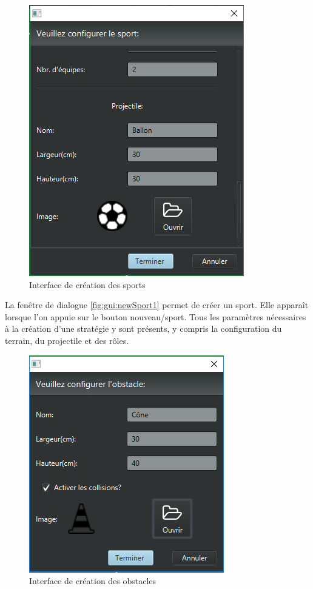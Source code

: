 \begin{figure}[htpb]
    \centering
    \includegraphics[scale=0.6]{fig/gui/newSport3.png}
    \caption{Interface de création des sports}
    \label{fig:gui:newSport3}
\end{figure}

La fenêtre de dialogue \ref{fig:gui:newSport1} permet de créer un sport.
Elle apparaît lorsque l'on appuie sur le bouton nouveau/sport.
Tous les paramètres nécessaires à la création d'une stratégie y sont présents, y compris la configuration du terrain, du projectile et des rôles.

\newpage

\begin{figure}[htpb]
    \centering
    \includegraphics[scale=0.6]{fig/gui/newObstacle.png}
    \caption{Interface de création des obstacles}
    \label{fig:gui:newObstacle}
\end{figure}

